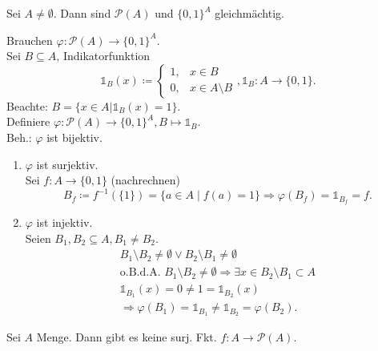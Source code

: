 \documentclass[../ana1.tex]{subfiles}
\begin{document}
\begin{lem}
	Sei \(A\neq\emptyset{} \). Dann sind \( \mathcal{P}(A) \) und \( {\{0,1\}}^A \) gleichmächtig.
\end{lem}
\begin{bew}
	Brauchen \(\varphi : \mathcal{P}(A) \rightarrow {\{0,1\}}^A \). \\
	Sei \(B \subseteq A \), Indikatorfunktion \[ \mathds{1}_B(x) \coloneqq \begin{cases}
			1, & x\in B            \\
			0, & x\in A\setminus B
		\end{cases}
		, \mathds{1}_B : A \rightarrow \{0,1\}. \]
	Beachte: \(B = \{x\in A | \mathds{1}_B(x) = 1 \} \). \\
	Definiere \( \varphi : \mathcal{P}(A) \rightarrow {\{0,1\}}^A, B \mapsto \mathds{1}_B \). \\
	Beh.: \(\varphi \) ist bijektiv.
	\begin{enumerate}
		\item \( \varphi \) ist surjektiv. \\
		      Sei \(f: A\rightarrow \{0,1\} \) (nachrechnen)
			  \[ B_f \coloneqq f^{-1} (\{1\}) = \{a \in A \; \vert \; f(a) = 1 \} \Rightarrow \varphi(B_f) = \mathds{1}_{B_f} = f. \]
		\item \( \varphi \) ist injektiv. \\
		      Seien \( B_1,B_2\subseteq A, B_1 \neq B_2 \).
		      \begin{align*}
			      B_1\setminus B_2 \neq \emptyset \vee B_2\setminus B_1 \neq \emptyset                                    \\
			      \text{o.B.d.A. } B_1 \setminus B_2 \neq \emptyset \Rightarrow \exists x \in B_2 \setminus B_1 \subset A \\
			      \mathds{1}_{B_1}(x) = 0 \neq 1 = \mathds{1}_{B_2}(x)                                                    \\
			      \Rightarrow \varphi(B_1) = \mathds{1}_{B_1} \neq \mathds{1}_{B_2} = \varphi(B_2).
		      \end{align*}
	\end{enumerate}
\end{bew}

\begin{lem}
	Sei \(A \) Menge. Dann gibt es keine surj. Fkt. \(f: A\rightarrow \mathcal{P}(A) \).
\end{lem}
\end{document}
